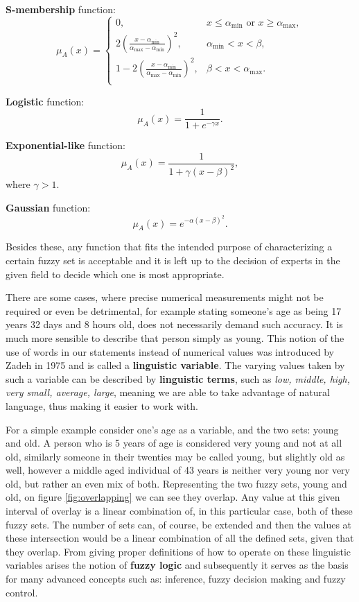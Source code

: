 \textbf{S-membership} function:
\[
	\mu_{A}(x) =
		\begin{cases}
			0, &x \leq \alpha_{\min} \text{ or } x \geq \alpha_{\max},\\
			2 {\left( \frac{x - \alpha_{\min}}{\alpha_{\max} - \alpha_{\min}} \right)}^2, &\alpha_{\min} < x < \beta,\\
			1 - 2 {\left( \frac{x - \alpha_{\min}}{\alpha_{\max} - \alpha_{\min}} \right)}^2, &\beta < x < \alpha_{\max}.\\
		\end{cases}
\]

\textbf{Logistic} function:
\[
	\mu_{A}(x) = \frac{1}{1 + e^{-\gamma x}}.
\]

\textbf{Exponential-like} function:
\[
	\mu_{A}(x) = \frac{1}{1 + \gamma(x - \beta)^2},
\]
where $\gamma > 1$.

\textbf{Gaussian} function:
\[
	\mu_{A}(x) = e^{-\alpha (x - \beta)^2}.
\]

Besides these, any function that fits the intended purpose of characterizing a certain fuzzy set is acceptable and it is left up to the decision of experts in the given field to decide which one is most appropriate.


There are some cases, where precise numerical measurements might not be required or even be detrimental, for example stating someone's age as being 17 years 32 days and 8 hours old, does not necessarily demand such accuracy. It is much more sensible to describe that person simply as young. This notion of the use of words in our statements instead of numerical values was introduced by Zadeh in 1975 and is called a \textbf{linguistic variable}. The varying values taken by such a variable can be described by \textbf{linguistic terms}, such as \textit{low, middle, high, very small, average, large}, meaning we are able to take advantage of natural language, thus making it easier to work with.

For a simple example consider one's age as a variable, and the two sets: young and old. A person who is 5 years of age is considered very young and not at all old, similarly someone in their twenties may be called young, but slightly old as well, however a middle aged individual of 43 years is neither very young nor very old, but rather an even mix of both. Representing the two fuzzy sets, young and old, on figure \ref{fig:overlapping} we can see they overlap. Any value at this given interval of overlay is a linear combination of, in this particular case, both of these fuzzy sets. The number of sets can, of course, be extended and then the values at these intersection would be a linear combination of all the defined sets, given that they overlap. From giving proper definitions of how to operate on these linguistic variables arises the notion of \textbf{fuzzy logic} and subsequently it serves as the basis for many advanced concepts such as: inference, fuzzy decision making and fuzzy control.

